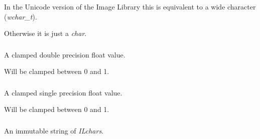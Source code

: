 In the Unicode version of the Image Library this is equivalent to a wide character ({\itshape wchar\+\_\+t}). 

Otherwise it is just a {\itshape char}. \hypertarget{group__il__types_ga2cf462921bb7bef1badc94d63f3dbd4d}{
\subsubsection[{I\+Lclampd}]{}}\label{group__il__types_ga2cf462921bb7bef1badc94d63f3dbd4d}


A clamped double precision float value. 

Will be clamped between 0 and 1. \hypertarget{group__il__types_gae90d8075bf3ef2cd89c09b26fd4dbef2}{
\subsubsection[{I\+Lclampf}]{}}\label{group__il__types_gae90d8075bf3ef2cd89c09b26fd4dbef2}


A clamped single precision float value. 

Will be clamped between 0 and 1. \hypertarget{group__il__types_ga1aa1edc3eb344e14acacb02bade24a5a}{
\subsubsection[{I\+Lconst\+\_\+string}]{}}\label{group__il__types_ga1aa1edc3eb344e14acacb02bade24a5a}


An immutable string of {\itshape I\+Lchars}. 

\hypertarget{group__il__types_ga3896ba656038eb34345347cd095b020a}{
\subsubsection[{I\+Ldouble}]{}}\label{group__il__types_ga3896ba656038eb34345347cd095b020a}


